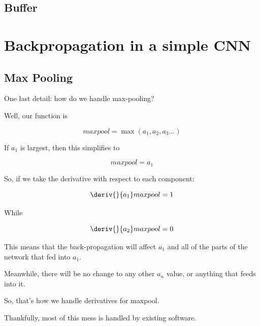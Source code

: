         
        
\subsection{Buffer}


\section{Backpropagation in a simple CNN}




\subsection{Max Pooling}
    
    One last detail: how do we handle max-pooling?
    
    Well, our function is
    
    \begin{equation*}
        maxpool= \max(a_1,a_2,a_3...)
    \end{equation*}
    
    If $a_1$ is largest, then this simplifies to
    
    \begin{equation*}
        maxpool = a_1
    \end{equation*}
    
    So, if we take the derivative with respect to each component:
    
    \begin{equation*}
        \deriv{}{a_1} maxpool = 1
    \end{equation*}
    
    While 
    
    \begin{equation*}
        \deriv{}{a_2} maxpool = 0
    \end{equation*}

    This means that the back-propagation will affect $a_1$ and all of the parts of the network that fed into $a_1$.
    
    Meanwhile, there will be no change to any other $a_n$ value, or anything that feeds into it.
    
    So, that's how we handle derivatives for maxpool.
    
    Thankfully, most of this mess is handled by existing software.






